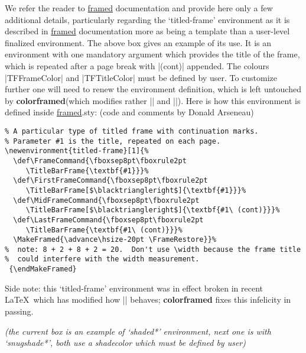\documentclass[a4paper,dvipdfmx,11pt]{article}
\def\ctanpackage#1{\href{https://ctan.org/pkg/#1}{#1}}
\newcommand\colorframed{%
        \texorpdfstring{{\color{joli}\bfseries colorframed}}{colorframed}\xspace}
\begin{document}
\begin{shaded*}
  We refer the reader to \ctanpackage{framed} documentation
  and provide here only a few additional details, particularly
  regarding the `titled-frame' environment as it is described
  in \ctanpackage{framed} documentation more as being a
  template than a user-level finalized environment.  The above
  box gives an example of its use.  It is an environment with
  one mandatory argument which provides the title of the
  frame, which is repeated after a page break with |(cont)|
  appended.  The colours |TFFrameColor| and
  |TFTitleColor| must be defined by user.  To customize
  further one will need to renew the environment definition,
  which is left untouched by \colorframed (which modifies
  rather |\TitleBarFrame| and |\CustomFBox|).  Here is
  how this environment is defined inside \ctanpackage{framed}.sty: (code and comments by Donald Arseneau)\par
\begin{footnotesize}
\begin{verbatim}
% A particular type of titled frame with continuation marks.  
% Parameter #1 is the title, repeated on each page.
\newenvironment{titled-frame}[1]{%
  \def\FrameCommand{\fboxsep8pt\fboxrule2pt
     \TitleBarFrame{\textbf{#1}}}%
  \def\FirstFrameCommand{\fboxsep8pt\fboxrule2pt
     \TitleBarFrame[$\blacktriangleright$]{\textbf{#1}}}%
  \def\MidFrameCommand{\fboxsep8pt\fboxrule2pt
     \TitleBarFrame[$\blacktriangleright$]{\textbf{#1\ (cont)}}}%
  \def\LastFrameCommand{\fboxsep8pt\fboxrule2pt
     \TitleBarFrame{\textbf{#1\ (cont)}}}%
  \MakeFramed{\advance\hsize-20pt \FrameRestore}}%
%  note: 8 + 2 + 8 + 2 = 20.  Don't use \width because the frame title
%  could interfere with the width measurement.
 {\endMakeFramed}
\end{verbatim}
\normalcolor
Side note: this `titled-frame' environment was in effect
broken in recent \LaTeX\ which has modified how |\smash|
behaves; \colorframed fixes this infelicity in passing.\par

\emph{(the current box is an example of \emph{`shaded*'} environment, next one is with
\emph{`snugshade*'}, both use a \emph{shadecolor} which must be defined by user)}
\par
\end{footnotesize}
\end{shaded*}
\end{document}
